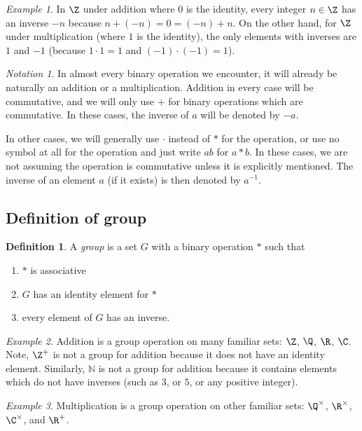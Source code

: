 \documentclass[12pt]{amsart}
\theoremstyle{plain}
\theoremstyle{definition}
\newtheorem{defn}[thm]{Definition}
\theoremstyle{remark}
\newtheorem*{notation}{Notation}
\newtheorem*{exam}{Example}
\begin{document}
\begin{exam}
In $\Z$ under addition where $0$ is the identity, every integer
$n\in\Z$ has an inverse $-n$ because $n+(-n) = 0=(-n)+n$.  On the
other hand, for $\Z$ under multiplication (where $1$ is the identity),
the only elements with inverses are $1$ and $-1$ (because $1\cdot 1 =
1$ and $(-1)\cdot (-1) = 1$).
\end{exam}

\begin{notation}
  In almost every binary operation we encounter, it will already be
  naturally an addition or a multiplication.  Addition in every case
  will be commutative, and we will only use $+$ for binary operations
  which are commutative.  In these cases, the inverse of $a$ will be
  denoted by $-a$.

  In other cases, we will generally use $\cdot$ instead of $*$ for the
  operation, or use no symbol at all for the operation and just write
  $ab$ for $a*b$.  In these cases, we are not assuming the operation
  is commutative unless it is explicitly mentioned.  The inverse of an
  element $a$ (if it exists) is then denoted by $a^{-1}$.
\end{notation}

\subsection{Definition of group}
\begin{defn}
  A \emph{group} is a set $G$ with a binary operation $*$ such that 
\begin{enumerate}
\item $*$ is associative
\item $G$ has an identity element for $*$
\item every element of $G$ has an inverse.
\end{enumerate}
\end{defn}

\begin{exam}
  Addition is a group operation on many familiar sets: $\Z$, $\Q$,
  $\R$, $\C$.  Note, $\Z^+$ is not a group for addition because it
  does not have an identity element.  Similarly, $\mathbb N$ is not a
  group for addition because it contains elements which do not have
  inverses (such as $3$, or $5$, or any  positive integer).
\end{exam}

\begin{exam}
  Multiplication is a group operation on other familiar sets:
  $\Q^\times$, $\R^\times$, $\C^\times$, and $\R^+$.
\end{exam}
\end{document}
